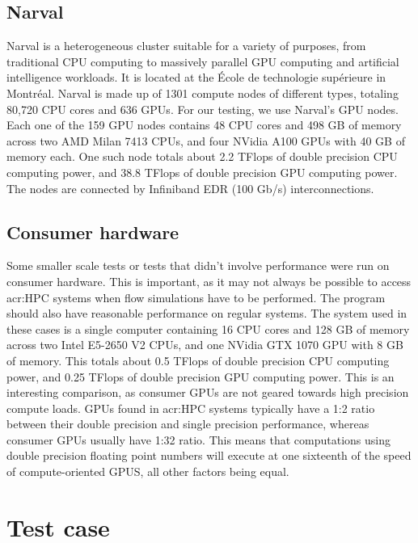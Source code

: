 \subsection{Narval} \label{subsection:results:platforms:narval}

Narval is a heterogeneous cluster suitable for a variety of purposes, from traditional CPU computing
to massively parallel GPU computing and artificial intelligence workloads. It is located at the
École de technologie supérieure in Montréal. Narval is made up of 1301 compute nodes of different
types, totaling 80,720 CPU cores and 636 GPUs. For our testing, we use Narval's GPU nodes. Each one
of the 159 GPU nodes contains 48 CPU cores and 498 GB of memory across two AMD Milan 7413 CPUs, and
four NVidia A100 GPUs with 40 GB of memory each. One such node totals about 2.2 TFlops of double
precision CPU computing power, and 38.8 TFlops of double precision GPU computing power. The nodes
are connected by Infiniband EDR (100 Gb/s) interconnections.

\subsection{Consumer hardware} \label{subsection:results:platforms:consumer}

Some smaller scale tests or tests that didn't involve performance were run on consumer hardware.
This is important, as it may not always be possible to access \acrshort{acr:HPC} systems when flow
simulations have to be performed. The program should also have reasonable performance on regular
systems. The system used in these cases is a single computer containing 16 CPU cores and 128 GB of
memory across two Intel E5-2650 V2 CPUs, and one NVidia GTX 1070 GPU with 8 GB of memory. This
totals about 0.5 TFlops of double precision CPU computing power, and 0.25 TFlops of double precision
GPU computing power. This is an interesting comparison, as consumer GPUs are not geared towards high
precision compute loads. GPUs found in \acrshort{acr:HPC} systems typically have a 1:2 ratio between
their double precision and single precision performance, whereas consumer GPUs usually have 1:32
ratio. This means that computations using double precision floating point numbers will execute at
one sixteenth of the speed of compute-oriented GPUS, all other factors being equal.

\section{Test case} \label{section:results:test_case}

